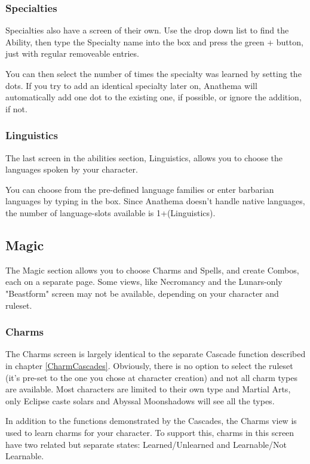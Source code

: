 \subsubsection{Specialties}
Specialties also have a screen of their own. Use the drop down list to find the Ability, then type the Specialty name into the box and press the green + button, just with regular removeable entries.

You can then select the number of times the specialty was learned by setting the dots. If you try to add an identical specialty later on, Anathema will automatically add one dot to the existing one, if possible, or ignore the addition, if not.

\subsubsection{Linguistics}
The last screen in the abilities section, Linguistics, allows you to choose the languages spoken by your character.

You can choose from the pre-defined language families or enter barbarian languages by typing in the box. Since Anathema doesn't handle native languages, the number of language-slots available is 1+(Linguistics).

\subsection{Magic}
The Magic section allows you to choose Charms and Spells, and create Combos, each on a separate page. Some views, like Necromancy and the Lunars-only "Beastform" screen may not be available, depending on your character and ruleset.

\subsubsection{Charms}
The Charms screen is largely identical to the separate Cascade function described in chapter \ref{CharmCascades}. Obviously, there is no option to select the ruleset (it's pre-set to the one you chose at character creation) and not all charm types are available. Most characters are limited to their own type and Martial Arts, only Eclipse caste solars and Abyssal Moonshadows will see all the types. 

In addition to the functions demonstrated by the Cascades, the Charms view is used to learn charms for your character. To support this, charms in this screen have two related but separate states: Learned/Unlearned and Learnable/Not Learnable. 

